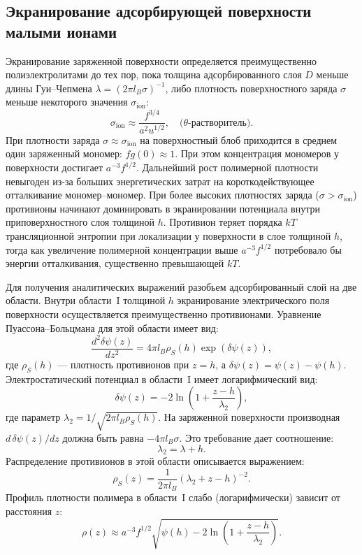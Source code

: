 \documentclass[12pt,a4paper]{article}
\begin{document}
\subsection{Экранирование адсорбирующей поверхности малыми ионами}

Экранирование заряженной поверхности определяется преимущественно полиэлектролитами до тех пор, пока толщина адсорбированного слоя $D$ меньше длины Гуи--Чепмена $\lambda = (2\pi l_B \sigma)^{-1}$, либо плотность поверхностного заряда $\sigma$ меньше некоторого значения $\sigma_{\text{ion}}$:
\begin{equation}
\sigma_{\text{ion}} \approx \frac{f^{3/4}}{a^2 u^{1/2}}, \quad \text{($\theta$-растворитель)}.
\end{equation}
При плотности заряда $\sigma \approx \sigma_{\text{ion}}$ на поверхностный блоб приходится в среднем один заряженный мономер: $f g(0) \approx 1$. При этом концентрация мономеров у поверхности достигает $a^{-3} f^{1/2}$. Дальнейший рост полимерной плотности невыгоден из-за больших энергетических затрат на короткодействующее отталкивание мономер--мономер. При более высоких плотностях заряда ($\sigma > \sigma_{\text{ion}}$) противионы начинают доминировать в экранировании потенциала внутри приповерхностного слоя толщиной $h$. Противион теряет порядка $kT$ трансляционной энтропии при локализации у поверхности в слое толщиной $h$, тогда как увеличение полимерной концентрации выше $a^{-3} f^{1/2}$ потребовало бы энергии отталкивания, существенно превышающей $kT$.

Для получения аналитических выражений разобьем адсорбированный слой на две области. Внутри области~I толщиной $h$ экранирование электрического поля поверхности осуществляется преимущественно противионами. Уравнение Пуассона--Больцмана для этой области имеет вид:
\begin{equation}
\frac{d^2 \delta\psi(z)}{dz^2} = 4\pi l_B \rho_S(h) \exp(\delta\psi(z)),
\end{equation}
где $\rho_S(h)$ --- плотность противионов при $z = h$, а $\delta\psi(z) = \psi(z) - \psi(h)$. Электростатический потенциал в области~I имеет логарифмический вид:
\begin{equation}
\delta\psi(z) = -2\ln\left( 1 + \frac{z - h}{\lambda_2} \right),
\end{equation}
где параметр $\lambda_2 = 1/\sqrt{2\pi l_B \rho_S(h)}$. На заряженной поверхности производная $d\,\delta\psi(z)/dz$ должна быть равна $-4\pi l_B \sigma$. Это требование дает соотношение:
\begin{equation}
\lambda_2 = \lambda + h.
\end{equation}
Распределение противионов в этой области описывается выражением:
\begin{equation}
\rho_S(z) = \frac{1}{2\pi l_B} (\lambda_2 + z - h)^{-2}.
\end{equation}
Профиль плотности полимера в области~I слабо (логарифмически) зависит от расстояния $z$:
\begin{equation}
\rho(z) \approx a^{-3} f^{1/2} \sqrt{\psi(h) - 2\ln\left( 1 + \frac{z - h}{\lambda_2} \right)}.
\end{equation}
\end{document}
